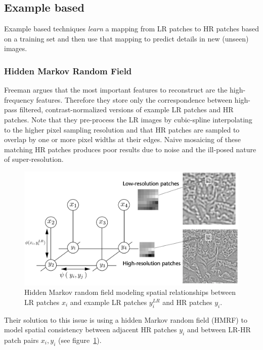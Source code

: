 \subsection{Example based}\label{subsec:example-based}

Example based techniques \textit{learn} a mapping from
LR patches to HR patches based on a training set and then use that mapping to predict details in new (unseen) images.

\subsubsection{Hidden Markov Random Field}

Freeman \etal\cite{freeman2002example} argues that the most important features to reconstruct are the high-frequency features.
%
Therefore they store only the correspondence between high-pass filtered, contrast-normalized versions of example LR patches and HR patches.
%
Note that they pre-process the LR images by cubic-spline interpolating to the higher pixel sampling resolution and that HR patches are sampled to overlap by one or more pixel widths at their edges.
%
Naive mosaicing of these matching HR patches produces poor results due to noise and the ill-posed nature of super-resolution.
%
\begin{figure}
	\centering
	\includegraphics[width=\linewidth,keepaspectratio]{figures/classical/mrf.png}
	\caption{Hidden Markov random field modeling spatial relationships between LR patches \(x_i\) and example LR patches \(y_i^{LR}\) and HR patches \(y_i\)\cite{freeman2002example}.}
	\label{fig:mrf}
\end{figure}
Their solution to this issue is using a hidden Markov random field (HMRF) to model spatial consistency between adjacent HR patches \(y_i\) and between LR-HR patch pairs \(x_i, y_i\) (see figure~\ref{fig:mrf}).

